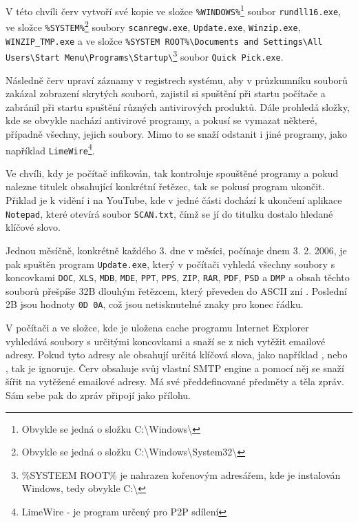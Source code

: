 \documentclass[a4paper,12pt]{article}
\begin{document}
V této chvíli červ vytvoří své kopie ve složce \texttt{\%WINDOWS\%}\footnote{Obvykle se 
jedná o složku C:\textbackslash Windows\textbackslash } soubor \texttt{rundll16.exe}, ve složce \texttt{\%SYSTEM\%}\footnote{Obvykle se jedná o složku C:\textbackslash Windows\textbackslash System32\textbackslash } soubory \texttt{scanregw.exe}, \texttt{Update.exe}, \texttt{Winzip.exe}, \texttt{WINZIP\_TMP.exe} a ve složce \texttt{\%SYSTEM ROOT\%\textbackslash Documents and Settings\textbackslash All Users\textbackslash Start Menu\textbackslash Pro\-grams\textbackslash Startup\textbackslash }\footnote{\%SYSTEEM ROOT\% je nahrazen kořenovým adresářem, kde je instalován Windows, tedy obvykle C:\textbackslash } soubor \texttt{Quick Pick.exe}.\cite{nyxem-fsecure}\cite{nyxem-trendmicro}

Následně červ upraví záznamy v registrech systému, aby v průzkumníku souborů zakázal zobrazení skrytých souborů, zajistil si spuštění při startu počítače a zabránil při startu spuštění různých antivirových produktů. Dále prohledá složky, kde se obvykle nachází antivirové programy, a pokusí se vymazat některé, případně všechny, jejich soubory. Mimo to se snaží odstanit i jiné programy, jako například \texttt{LimeWire}\footnote{LimeWire - je program určený pro P2P sdílení}.\cite{nyxem-caida}\cite{nyxem-fsecure}\cite{nyxem-trendmicro}

Ve chvíli, kdy je počítač infikován, tak kontroluje spouštěné programy a pokud nalezne titulek obsahující konkrétní řetězec, tak se pokusí program ukončit\cite{nyxem-fsecure}. Přiklad je k vidění i na YouTube\cite{nyxem-youtube}, kde v jedné části dochází k ukončení aplikace \texttt{Notepad}, které otevírá soubor \texttt{SCAN.txt}, čímž se jí do titulku dostalo hledané klíčové slovo.

Jednou měsíčně, konkrétně každého 3. dne v měsíci, počínaje dnem 3. 2. 2006, je pak spuštěn program \texttt{Update.exe}, který v počítači vyhledá všechny soubory s koncovkami \texttt{DOC}, \texttt{XLS}, \texttt{MDB}, \texttt{MDE}, \texttt{PPT}, \texttt{PPS}, \texttt{ZIP}, \texttt{RAR}, \texttt{PDF}, \texttt{PSD} a \texttt{DMP} a obsah těchto souborů přešpíše 32B dlouhým řetězcem, který převeden do ASCII zní . Poslední 2B jsou hodnoty \texttt{0D 0A}, což jsou netisknutelné znaky pro konec řádku.\cite{nyxem-securelist}\cite{nyxem-fsecure}

V počítači a ve složce, kde je uložena cache programu Internet Explorer vyhledává soubory s určitými koncovkami a snaží se z nich vytěžit emailové adresy. Pokud tyto adresy ale obsahují určitá klíčová slova, jako například , nebo , tak je ignoruje\cite{nyxem-fsecure}. Červ obsahuje svůj vlastní SMTP engine\cite{nyxem-trendmicro} a pomocí něj se snaží šířit na vytěžené emailové adresy. Má své předdefinované předměty a těla zpráv. Sám sebe pak do zpráv připojí jako přílohu.\cite{nyxem-fsecure}
\end{document}
